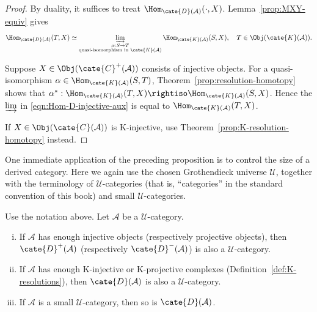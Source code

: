 \begin{proof}
	By duality, it suffices to treat
	$\Hom_{\cate{D}(\mathcal{A})}(\cdot, X)$. Lemma~\ref{prop:MXY-equiv}
	gives
	\begin{equation}\label{eqn:Hom-D-injective-aux}
		\Hom_{\cate{D}(\mathcal{A})}(T, X) \simeq \varinjlim_{\substack{\alpha: S \to T \\ \text{quasi-isomorphism in }\cate{K}(\mathcal{A})}} \Hom_{\cate{K}(\mathcal{A})}(S, X), \quad T \in \Obj(\cate{K}(\mathcal{A})).
	\end{equation}

	Suppose $X \in \Obj(\cate{C}^+(\mathcal{A}))$ consists of injective
	objects. For a quasi-isomorphism
	$\alpha \in \Hom_{\cate{K}(\mathcal{A})}(S, T)$,
	Theorem~\ref{prop:resolution-homotopy} shows that
	$\alpha^*: \Hom_{\cate{K}(\mathcal{A})}(T, X) \rightiso
	\Hom_{\cate{K}(\mathcal{A})}(S, X)$. Hence the $\varinjlim$ in
	\eqref{eqn:Hom-D-injective-aux} is equal to
	$\Hom_{\cate{K}(\mathcal{A})}(T, X)$.

	If $X \in \Obj(\cate{C}(\mathcal{A}))$ is K-injective, use
	Theorem~\ref{prop:K-resolution-homotopy} instead.
\end{proof}

One immediate application of the preceding proposition is to control the size
of a derived category. Here we again use the chosen Grothendieck universe
$\mathcal{U}$, together with the terminology of $\mathcal{U}$-categories
(that is, “categories” in the standard convention of this book) and small
$\mathcal{U}$-categories.

\begin{corollary}\label{prop:D-size}
	Use the notation above. Let $\mathcal{A}$ be a $\mathcal{U}$-category.
	\begin{enumerate}[(i)]
		\item If $\mathcal{A}$ has enough injective objects (respectively
		projective objects), then $\cate{D}^+(\mathcal{A})$ (respectively
		$\cate{D}^-(\mathcal{A})$) is also a $\mathcal{U}$-category.
		\item If $\mathcal{A}$ has enough K-injective or K-projective
		complexes (Definition~\ref{def:K-resolutions}), then
		$\cate{D}(\mathcal{A})$ is also a $\mathcal{U}$-category.
		\item If $\mathcal{A}$ is a small $\mathcal{U}$-category, then so is
		$\cate{D}(\mathcal{A})$.
	\end{enumerate}
\end{corollary}

